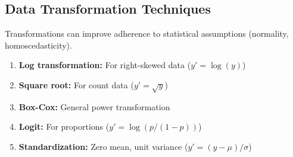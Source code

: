 \subsection{Data Transformation Techniques}

Transformations can improve adherence to statistical assumptions (normality, homoscedasticity).

\begin{enumerate}
    \item \textbf{Log transformation:} For right-skewed data ($y' = \log(y)$)
    \item \textbf{Square root:} For count data ($y' = \sqrt{y}$)
    \item \textbf{Box-Cox:} General power transformation
    \item \textbf{Logit:} For proportions ($y' = \log(p/(1-p))$)
    \item \textbf{Standardization:} Zero mean, unit variance ($y' = (y - \mu)/\sigma$)
\end{enumerate}

